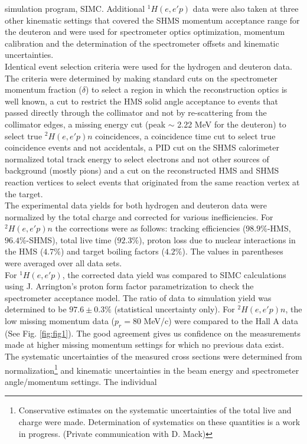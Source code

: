 simulation program, SIMC. Additional $^{1}H(e,e'p)$ data were also taken at three other kinematic settings that covered the SHMS momentum acceptance range for the deuteron and were used for spectrometer optics optimization, 
momentum calibration and the determination of the spectrometer offsets and kinematic uncertainties\cite{cyero_specKinUnc,cyero_SHMSOptics}.\\
\indent Identical event selection criteria were used for the hydrogen and deuteron data. The criteria were determined by making standard cuts on the spectrometer momentum fraction ($\delta$) to select a region in which the reconstruction optics
is well known,  a cut to restrict the HMS solid angle acceptance to events that passed directly through the collimator and not by re-scattering from the collimator edges, a missing
energy cut (peak $\sim$ 2.22 MeV for the deuteron) to select true $^{2}H(e,e'p)n$ coincidences, a coincidence time cut to select true coincidence events and not accidentals,  a PID cut on the
SHMS calorimeter normalized total track energy to select electrons and not other sources of background (mostly pions) and a cut on the reconstructed HMS and SHMS reaction vertices to select events that 
originated from the same reaction vertex at the target.\\
\indent The experimental data yields for both hydrogen and deuteron data were normalized by the total charge and corrected for various inefficiencies. For $^{2}H(e,e'p)n$ the corrections
were as follows: tracking efficiencies ($98.9 \%$-HMS, $96.4 \%$-SHMS), total live time ($92.3 \%$), proton loss due to nuclear interactions in the HMS ($4.7 \%$)\cite{cyero_pAbs} and
target boiling factors ($4.2 \%$)\cite{cyero_tgtBoil}. The values in parentheses were averaged over all data sets. \\
\indent For $^{1}H(e,e'p)$, the corrected data yield was compared to SIMC calculations using J. Arrington's proton form factor parametrization\cite{PhysRevC.69.022201} to check the spectrometer acceptance
model. The ratio of data to simulation yield was determined to be $97.6\pm0.3 \%$ (statistical uncertainty only). For $^{2}H(e,e'p)n$, the low missing momentum data ($p_{r}=80$ MeV/c) were compared to the Hall A data (See Fig. \ref{fig:fig1}).
The good agreement gives us confidence on the measurements made at higher missing momentum settings for which no previous data exist. \\
\indent The systematic uncertainties of the measured cross sections were determined from 
normalization\footnote{Conservative estimates on the systematic uncertainties of the total live and charge were made.
Determination of systematics on these quantities is a work in progress. (Private communication with D. Mack)} and kinematic uncertainties in the beam energy and spectrometer angle/momentum settings. The individual

